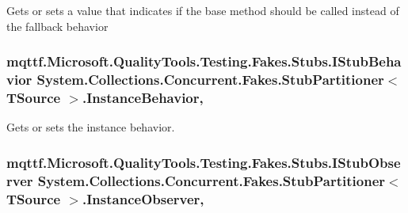 Gets or sets a value that indicates if the base method should be called instead of the fallback behavior

\hypertarget{class_system_1_1_collections_1_1_concurrent_1_1_fakes_1_1_stub_partitioner_3_01_t_source_01_4_aab9dbd3090915d14014359dcee5cf643}{
\subsubsection[{Instance\-Behavior}]{\setlength{\rightskip}{0pt plus 5cm}mqttf.\-Microsoft.\-Quality\-Tools.\-Testing.\-Fakes.\-Stubs.\-I\-Stub\-Behavior System.\-Collections.\-Concurrent.\-Fakes.\-Stub\-Partitioner$<$ T\-Source $>$.Instance\-Behavior\hspace{0.3cm}{\ttfamily [get]}, {\ttfamily [set]}}}\label{class_system_1_1_collections_1_1_concurrent_1_1_fakes_1_1_stub_partitioner_3_01_t_source_01_4_aab9dbd3090915d14014359dcee5cf643}


Gets or sets the instance behavior.

\hypertarget{class_system_1_1_collections_1_1_concurrent_1_1_fakes_1_1_stub_partitioner_3_01_t_source_01_4_a855f055bcf26dd30cdc27b1011cb240e}{
\subsubsection[{Instance\-Observer}]{\setlength{\rightskip}{0pt plus 5cm}mqttf.\-Microsoft.\-Quality\-Tools.\-Testing.\-Fakes.\-Stubs.\-I\-Stub\-Observer System.\-Collections.\-Concurrent.\-Fakes.\-Stub\-Partitioner$<$ T\-Source $>$.Instance\-Observer\hspace{0.3cm}{\ttfamily [get]}, {\ttfamily [set]}}}\label{class_system_1_1_collections_1_1_concurrent_1_1_fakes_1_1_stub_partitioner_3_01_t_source_01_4_a855f055bcf26dd30cdc27b1011cb240e}


